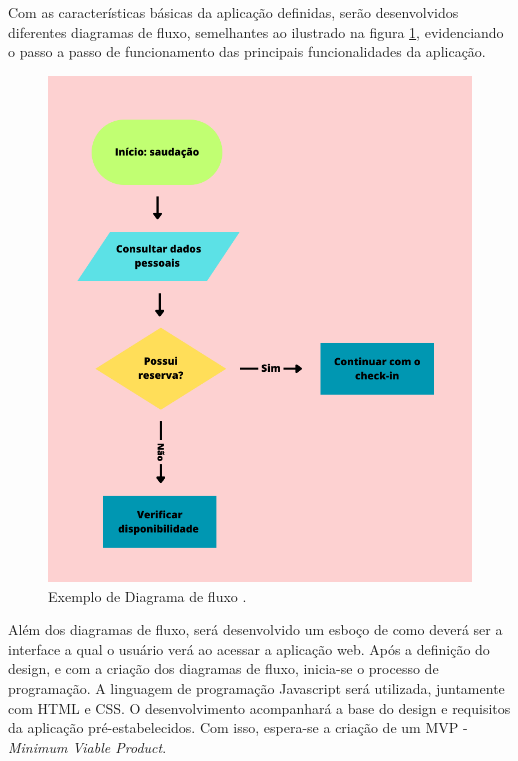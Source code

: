 \documentclass[
	12pt,				%
	openright,			%
	oneside,			%
	a4paper,			%
	english,			%
	brazil				%
	]{abntex2}
\begin{document}
Com as características básicas da aplicação definidas, serão desenvolvidos diferentes diagramas de fluxo, semelhantes ao ilustrado na figura \ref{fig:diagrama_fluxo}, evidenciando o passo a passo de funcionamento das principais funcionalidades da aplicação. 

\begin{figure}[ht] 
	\centering
	\includegraphics[scale=0.4]{exemplo_diagrama_de_fluxo.png}
	\caption[Exemplo de diagrama de fluxo]{Exemplo de Diagrama de fluxo \cite{ebac_diagrama_fluxo}.}
	\label{fig:diagrama_fluxo}
\end{figure}

Além dos diagramas de fluxo, será desenvolvido um esboço de como deverá ser a interface a qual o usuário verá ao acessar a aplicação web. Após a definição do design, e com a criação dos diagramas de fluxo, inicia-se o processo de programação. A linguagem de programação Javascript será utilizada, juntamente com HTML e CSS. O desenvolvimento acompanhará a base do design e requisitos da aplicação pré-estabelecidos. Com isso, espera-se a criação de um MVP - \textit{Minimum Viable Product}.
\end{document}
